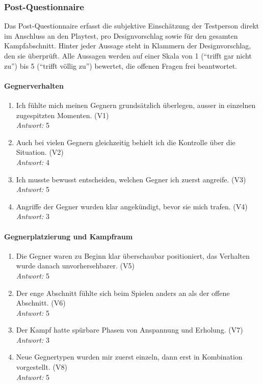 \documentclass[../Main.tex]{subfiles}
\begin{document}
\subsubsection{Post-Questionnaire}

Das Post-Questionnaire erfasst die subjektive Einschätzung der Testperson direkt im Anschluss an den Playtest, pro Designvorschlag sowie für den gesamten Kampfabschnitt. Hinter jeder Aussage steht in Klammern der Designvorschlag, den sie überprüft. Alle Aussagen werden auf einer Skala von 1 (\enquote{trifft gar nicht zu}) bis 5 (\enquote{trifft völlig zu}) bewertet, die offenen Fragen frei beantwortet.

\paragraph{Gegnerverhalten}
\begin{enumerate}[label=\textbf{Q\arabic*}, leftmargin=1.5cm, itemsep=0.8em]
    \item Ich fühlte mich meinen Gegnern grundsätzlich überlegen, ausser in einzelnen zugespitzten Momenten. \hfill (V1) \\
    \textit{Antwort:} 5
    \item Auch bei vielen Gegnern gleichzeitig behielt ich die Kontrolle über die Situation. \hfill (V2) \\
    \textit{Antwort:} 4
    \item Ich musste bewusst entscheiden, welchen Gegner ich zuerst angreife. \hfill (V3) \\
    \textit{Antwort:} 5
    \item Angriffe der Gegner wurden klar angekündigt, bevor sie mich trafen. \hfill (V4) \\
    \textit{Antwort:} 3
\end{enumerate}

\paragraph{Gegnerplatzierung und Kampfraum}
\begin{enumerate}[label=\textbf{Q\arabic*}, leftmargin=1.5cm, itemsep=0.8em, resume]
    \item Die Gegner waren zu Beginn klar überschaubar positioniert, das Verhalten wurde danach unvorhersehbarer. \hfill (V5) \\
    \textit{Antwort:} 5
    \item Der enge Abschnitt fühlte sich beim Spielen anders an als der offene Abschnitt. \hfill (V6) \\
    \textit{Antwort:} 5
    \item Der Kampf hatte spürbare Phasen von Anspannung und Erholung. \hfill (V7) \\
    \textit{Antwort:} 3
    \item Neue Gegnertypen wurden mir zuerst einzeln, dann erst in Kombination vorgestellt. \hfill (V8) \\
    \textit{Antwort:} 5
\end{enumerate}
\end{document}
